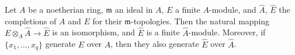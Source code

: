Let $A$ be a noetherian ring, $\mathfrak{m}$ an ideal in $A$, $E$ a finite $A$-module, and $\hat{A}$, $\hat{E}$ the completions of $A$ and $E$ for their $\mathfrak{m}$-topologies. Then the natural mapping $E \otimes_A \hat{A} \to \hat{E}$ is an isomorphism, and $\hat{E}$ is a finite $\hat{A}$-module. Moreover, if $\{x_1, \ldots, x_q\}$ generate $E$ over $A$, then they also generate $\hat{E}$ over $\hat{A}$.